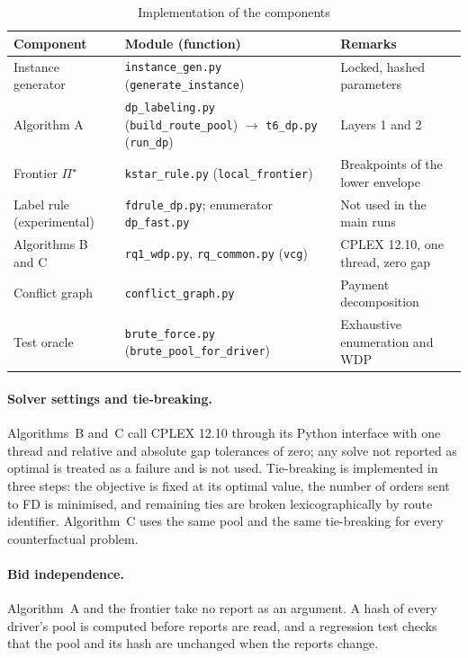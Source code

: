 \begin{table}[t]
\centering
\caption{Implementation of the components}
\label{tab:modules}
\small
\begin{tabular}{P{3.6cm}P{6.0cm}P{4.6cm}}
\toprule
Component & Module (function) & Remarks\\
\midrule
Instance generator & \texttt{instance\_gen.py} (\texttt{generate\_instance}) & Locked, hashed parameters\\
Algorithm A & \texttt{dp\_labeling.py} (\texttt{build\_route\_pool}) $\to$ \texttt{t6\_dp.py} (\texttt{run\_dp}) & Layers 1 and 2\\
Frontier $\Pi^\star$ & \texttt{kstar\_rule.py} (\texttt{local\_frontier}) & Breakpoints of the lower envelope\\
Label rule (experimental) & \texttt{fdrule\_dp.py}; enumerator \texttt{dp\_fast.py} & Not used in the main runs\\
Algorithms B and C & \texttt{rq1\_wdp.py}, \texttt{rq\_common.py} (\texttt{vcg}) & CPLEX 12.10, one thread, zero gap\\
Conflict graph & \texttt{conflict\_graph.py} & Payment decomposition\\
Test oracle & \texttt{brute\_force.py} (\texttt{brute\_pool\_for\_driver}) & Exhaustive enumeration and WDP\\
\bottomrule
\end{tabular}
\end{table}

\paragraph{Solver settings and tie-breaking.} Algorithms~B and~C call CPLEX
12.10 through its Python interface with one thread and relative and absolute
gap tolerances of zero; any solve not reported as optimal is treated as a
failure and is not used. Tie-breaking is implemented in three steps: the
objective is fixed at its optimal value, the number of orders sent to FD is
minimised, and remaining ties are broken lexicographically by route
identifier. Algorithm~C uses the same pool and the same tie-breaking for
every counterfactual problem.

\paragraph{Bid independence.} Algorithm~A and the frontier take no report
as an argument. A hash of every driver's pool is computed before reports are
read, and a regression test checks that the pool and its hash are unchanged
when the reports change.

